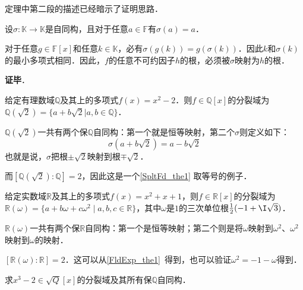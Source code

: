 定理中第二段的描述已经暗示了证明思路．

设$\sigma:\mathbb{K}\to\mathbb{K}$是自同构，且对于任意$a\in\mathbb{F}$有$\sigma(a)=a$．

对于任意$g\in\mathbb{F}[x]$和任意$k\in\mathbb{K}$，必有$\sigma(g(k))=g(\sigma(k))$．因此$k$和$\sigma(k)$的最小多项式相同．因此，$f$的任意不可约因子$h$的根，必须被$\sigma$映射为$h$的根．





\textbf{证毕}．

\begin{example}{}

给定有理数域$\mathbb{Q}$及其上的多项式$f(x)=x^2-2$．则$f\in\mathbb{Q}[x]$的分裂域为$\mathbb{Q}(\sqrt{2})=\{a+b\sqrt{2}|a, b\in\mathbb{Q}\}$．

$\mathbb{Q}(\sqrt{2})$一共有两个保$\mathbb{Q}$自同构：第一个就是恒等映射，第二个$\sigma$则定义如下：
\begin{equation}
\sigma(a+b\sqrt{2})=a-b\sqrt{2}
\end{equation}
也就是说，$\sigma$把根$\pm\sqrt{2}$映射到根$\mp\sqrt{2}$．


而$[\mathbb{Q}(\sqrt{2}):\mathbb{Q}]=2$，因此这是一个\autoref{SpltFd_the1} 取等号的例子．

\end{example}


\begin{example}{}
给定实数域$\mathbb{R}$及其上的多项式$f(x)=x^2+x+1$，则$f\in\mathbb{R}[x]$的分裂域为$\mathbb{R}(\omega)=\{a+b\omega+c\omega^2 \mid a, b, c\in\mathbb{R}\}$，其中$\omega$是$1$的三次单位根$\frac{1}{2}(-1+\I\sqrt{3})$．

$\mathbb{R}(\omega)$一共有两个保$\mathbb{R}$自同构：第一个是恒等映射；第二个则是将$\omega$映射到$\omega^2$、$\omega^2$映射到$\omega$的映射．

$[\mathbb{R}(\omega):\mathbb{R}]=2$．这可以从\autoref{FldExp_the1}~得到，也可以验证$\omega^2=-1-\omega$得到．
\end{example}





\begin{exercise}{}
求$x^3-2\in\sqrt{Q}[x]$的分裂域及其所有保$\mathbb{Q}$自同构．
\end{exercise}



